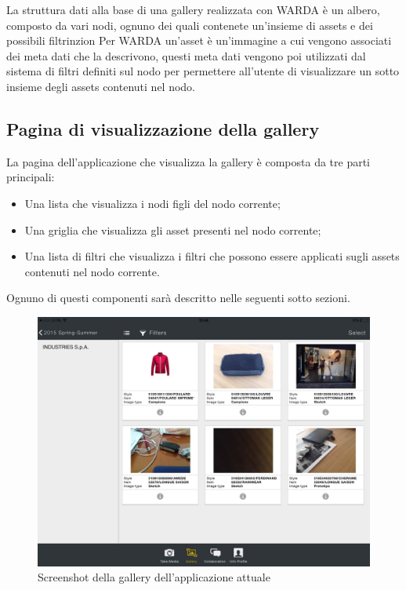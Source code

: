 La struttura dati alla base di una gallery realizzata con WARDA è un albero, composto da vari nodi, ognuno dei quali contenete un'insieme di assets e dei possibili filtrinzion
Per WARDA un'asset è un'immagine a cui vengono associati dei meta dati che la descrivono, questi meta dati vengono poi utilizzati dal sistema di filtri definiti sul nodo per permettere all'utente di visualizzare un sotto insieme degli assets contenuti nel nodo.

\subsection{Pagina di visualizzazione della gallery}

La pagina dell'applicazione che visualizza la gallery è composta da tre parti principali:
\begin{itemize}
\item Una lista che visualizza i nodi figli del nodo corrente;
\item Una griglia che visualizza gli asset presenti nel nodo corrente;
\item Una lista di filtri che visualizza i filtri che possono essere applicati sugli assets contenuti nel nodo corrente.
\end{itemize}
Ognuno di questi componenti sarà descritto nelle seguenti sotto sezioni.

\begin{figure}[htp]
\centering
\includegraphics[width=\textwidth]{../immagini/warda-gallery}
\caption{Screenshot della gallery dell'applicazione attuale}  
\end{figure}

